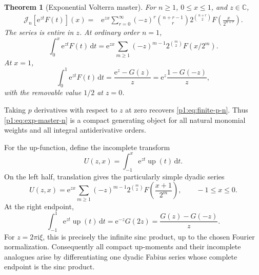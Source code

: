 \documentclass[11pt,oneside]{article}
\newtheorem{theorem}{Theorem}[section]
\theoremstyle{definition}
\theoremstyle{remark}
\newcommand{\Up}{\operatorname{up}}
\newcommand{\C}{\mathbb C}
\newcommand{\dd}{\,\mathrm d}
\newcommand{\e}{\mathrm e}
\newcommand{\ii}{\mathrm i}
\newcommand{\Jn}{\mathcal J}
\newcommand{\1}{\mathbf 1}
\begin{document}
\begin{theorem}[Exponential Volterra master]\label{p1:thm:exp-master}
For \(n\geq1\), \(0\leq x\leq1\), and \(z\in\C\),
\begin{equation}
 \boxed{\begin{aligned}
 \Jn_n[\e^{zt}F(t)](x)
 ={}&\e^{zx}\sum_{r=0}^{\infty}(-z)^r\binom{n+r-1}{r}
 2^{\binom{n+r}{2}}F\!\left(\frac{x}{2^{n+r}}\right).
 \end{aligned}}                                                \label{p1:eq:exp-master-n}
\end{equation}
The series is entire in \(z\).  At ordinary order \(n=1\),
\begin{equation}
 \int_0^x\e^{zt}F(t)\dd t
 =\e^{zx}\sum_{m\geq1}(-z)^{m-1}2^{\binom m2}F(x/2^m).         \label{p1:eq:exp-master-one}
\end{equation}
At \(x=1\),
\begin{equation}
 \boxed{\quad
 \int_0^1\e^{zt}F(t)\dd t
 =\frac{\e^z-G(z)}{z}
 =\e^z\frac{1-G(-z)}{z},
 \quad}                                                        \label{p1:eq:exp-definite}
\end{equation}
with the removable value \(1/2\) at \(z=0\).
\end{theorem}

Taking \(p\) derivatives with respect to \(z\) at zero recovers
\eqref{p1:eq:finite-p-n}.  Thus \eqref{p1:eq:exp-master-n} is a compact generating
object for all natural monomial weights and all integral antiderivative orders.

For the up-function, define the incomplete transform
\begin{equation}
 U(z,x)=\int_{-1}^x\e^{zt}\Up(t)\dd t.                          \label{p1:eq:U-zx}
\end{equation}
On the left half, translation gives the particularly simple dyadic series
\begin{equation}
 U(z,x)=\e^{zx}\sum_{m\geq1}(-z)^{m-1}2^{\binom m2}
 F\!\left(\frac{x+1}{2^m}\right),\qquad -1\leq x\leq0.        \label{p1:eq:U-left-exp}
\end{equation}
At the right endpoint,
\begin{equation}
 \int_{-1}^1\e^{zt}\Up(t)\dd t
 =\e^{-z}G(2z)=\frac{G(z)-G(-z)}{z}.                            \label{p1:eq:up-mgf}
\end{equation}
For \(z=2\pi\ii\xi\), this is precisely the infinite sinc product, up to the
chosen Fourier normalization.  Consequently all compact up-moments and their
incomplete analogues arise by differentiating one dyadic Fabius series whose
complete endpoint is the sinc product.
\end{document}
